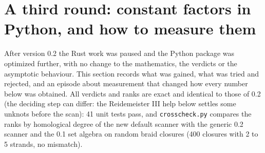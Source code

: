 \section{A third round: constant factors in Python, and how to measure them}
\label{sec:round3}

After version 0.2 the Rust work was paused and the Python package was
optimized further, with no change to the mathematics, the verdicts or the
asymptotic behaviour. This section records what was gained, what was tried and
rejected, and an episode about measurement that changed how every number below
was obtained. All verdicts and ranks are exact and identical to those of 0.2
(the deciding step can differ: the Reidemeister III help below settles some
unknots before the scan): 41 unit tests pass, and \texttt{crosscheck.py} compares the ranks by homological degree
of the new default scanner with the generic 0.2 scanner and the 0.1 set algebra
on random braid closures (400 closures with 2 to 5 strands, no mismatch).

